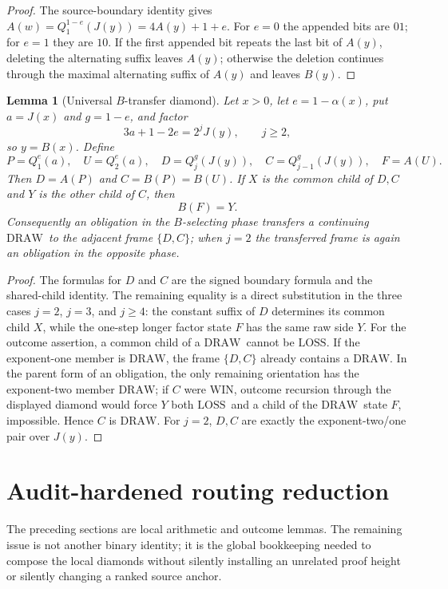 \documentclass[11pt]{article}
\newtheorem{lemma}[theorem]{Lemma}
\newcommand{\WIN}{\ensuremath{\mathrm{WIN}}}
\newcommand{\LOSS}{\ensuremath{\mathrm{LOSS}}}
\newcommand{\DRAW}{\ensuremath{\mathrm{DRAW}}}
\begin{document}
\begin{proof}
The source-boundary identity gives
$A(w)=Q_1^{1-e}(J(y))=4A(y)+1+e$. For $e=0$ the appended bits are $01$;
for $e=1$ they are $10$. If the first appended bit repeats the last bit of
$A(y)$, deleting the alternating suffix leaves $A(y)$; otherwise the deletion
continues through the maximal alternating suffix of $A(y)$ and leaves
$B(y)$.
\end{proof}

\begin{lemma}[Universal $B$-transfer diamond]\label{lem:b-diamond}
Let $x>0$, let $e=1-\alpha(x)$, put $a=J(x)$ and $g=1-e$, and factor
\[
  3a+1-2e=2^jJ(y),\qquad j\ge2,
\]
so $y=B(x)$. Define
\[
 P=Q_1^e(a),\quad U=Q_2^e(a),\quad
 D=Q_j^g(J(y)),\quad C=Q_{j-1}^g(J(y)),\quad F=A(U).
\]
Then $D=A(P)$ and $C=B(P)=B(U)$. If $X$ is the common child of $D,C$ and
$Y$ is the other child of $C$, then
\[
  B(F)=Y.
\]
Consequently an obligation in the $B$-selecting phase transfers a continuing
\DRAW\ to the adjacent frame $\{D,C\}$; when $j=2$ the transferred frame is
again an obligation in the opposite phase.
\end{lemma}

\begin{proof}
The formulas for $D$ and $C$ are the signed boundary formula and the
shared-child identity. The remaining equality is a direct substitution in the
three cases $j=2$, $j=3$, and $j\ge4$: the constant suffix of $D$ determines
its common child $X$, while the one-step longer factor state $F$ has the same
raw side $Y$. For the outcome assertion, a common child of a \DRAW\ cannot be
\LOSS. If the exponent-one member is \DRAW, the frame $\{D,C\}$ already
contains a \DRAW. In the parent form of an obligation, the only remaining
orientation has the exponent-two member \DRAW; if $C$ were \WIN, outcome
recursion through the displayed diamond would force $Y$ both \LOSS\ and a
child of the \DRAW\ state $F$, impossible. Hence $C$ is \DRAW. For $j=2$,
$D,C$ are exactly the exponent-two/one pair over $J(y)$.
\end{proof}


\section{Audit-hardened routing reduction}\label{sec:routing}

The preceding sections are local arithmetic and outcome lemmas.  The remaining
issue is not another binary identity; it is the global bookkeeping needed to
compose the local diamonds without silently installing an unrelated proof
height or silently changing a ranked source anchor.
\end{document}
